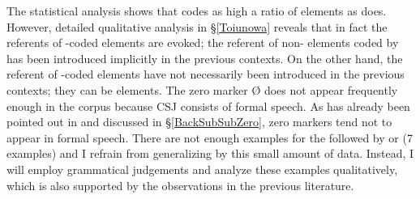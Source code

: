 The statistical analysis shows that
 codes as high a ratio of  elements as  does.
However, detailed qualitative analysis in \S \ref{Toiunowa} reveals that
in fact the referents of -coded elements are evoked;
the referent of non- elements coded by  has been introduced implicitly in the previous contexts.
On the other hand,
the referent of -coded elements have not necessarily been introduced in the previous contexts;
they can be  elements.
The zero marker {\O} does not appear frequently enough in the corpus because CSJ consists of formal speech.
As has already been pointed out in  and discussed in \S \ref{BackSubSubZero},
zero markers tend not to appear in formal speech.
There are not enough examples for the  followed by  or  (7 examples)
and I refrain from generalizing by this small amount of data.
Instead,
I will employ grammatical judgements and analyze these examples qualitatively,
which is also supported by the observations in the previous literature.

